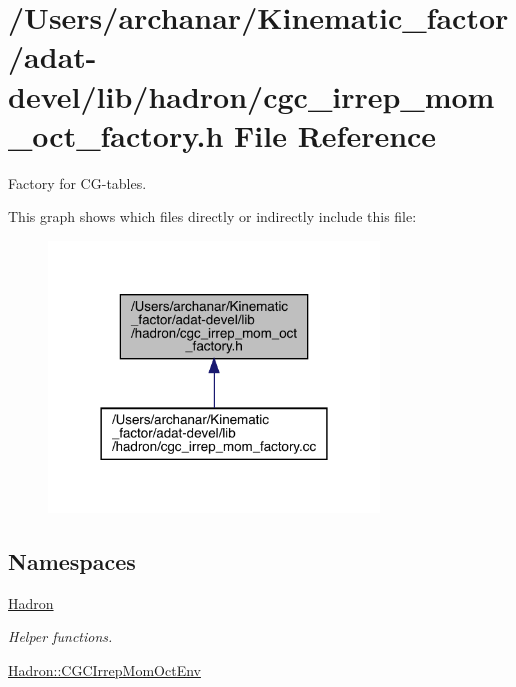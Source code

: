 \hypertarget{adat-devel_2lib_2hadron_2cgc__irrep__mom__oct__factory_8h}{}\section{/\+Users/archanar/\+Kinematic\+\_\+factor/adat-\/devel/lib/hadron/cgc\+\_\+irrep\+\_\+mom\+\_\+oct\+\_\+factory.h File Reference}
\label{adat-devel_2lib_2hadron_2cgc__irrep__mom__oct__factory_8h}


Factory for C\+G-\/tables.  


This graph shows which files directly or indirectly include this file\+:
\nopagebreak
\begin{figure}[H]
\begin{center}
\leavevmode
\includegraphics[width=249pt]{da/dc5/adat-devel_2lib_2hadron_2cgc__irrep__mom__oct__factory_8h__dep__incl}
\end{center}
\end{figure}
\subsection*{Namespaces}
\begin{DoxyCompactItemize}
\item 
 \mbox{\hyperlink{namespaceHadron}{Hadron}}
\begin{DoxyCompactList}\small\item\em Helper functions. \end{DoxyCompactList}\item 
 \mbox{\hyperlink{namespaceHadron_1_1CGCIrrepMomOctEnv}{Hadron\+::\+C\+G\+C\+Irrep\+Mom\+Oct\+Env}}
\end{DoxyCompactItemize}
